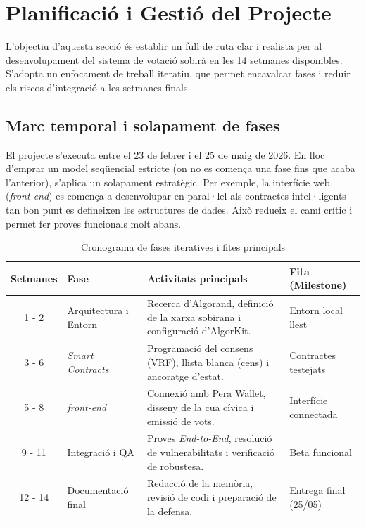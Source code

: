 \newpage
\section{Planificació i Gestió del Projecte}

L'objectiu d'aquesta secció és establir un full de ruta clar i realista per al desenvolupament del sistema de votació sobirà en les 14 setmanes disponibles. S'adopta un enfocament de treball iteratiu, que permet encavalcar fases i reduir els riscos d'integració a les setmanes finals.

\subsection{Marc temporal i solapament de fases}

El projecte s'executa entre el 23 de febrer i el 25 de maig de 2026. En lloc d'emprar un model seqüencial estricte (on no es comença una fase fins que acaba l'anterior), s'aplica un solapament estratègic. Per exemple, la interfície web (\textit{front-end}) es comença a desenvolupar en paral·lel als contractes intel·ligents tan bon punt es defineixen les estructures de dades. Això redueix el camí crític i permet fer proves funcionals molt abans.



\begin{table}[H]
\centering
\renewcommand{\arraystretch}{1.3}
\begin{tabularx}{\textwidth}{|c|l|X|l|}
\hline
\textbf{Setmanes} & \textbf{Fase} & \textbf{Activitats principals} & \textbf{Fita (Milestone)} \\ \hline
1 - 2 & Arquitectura i Entorn & Recerca d'Algorand, definició de la xarxa sobirana i configuració d'AlgorKit. & Entorn local llest \\ \hline
3 - 6 & \textit{Smart Contracts} & Programació del consens (VRF), llista blanca (cens) i ancoratge d'estat. & Contractes testejats \\ \hline
5 - 8 & \textit{front-end} & Connexió amb Pera Wallet, disseny de la cua cívica i emissió de vots. & Interfície connectada \\ \hline
9 - 11 & Integració i QA & Proves \textit{End-to-End}, resolució de vulnerabilitats i verificació de robustesa. & Beta funcional \\ \hline
12 - 14 & Documentació final & Redacció de la memòria, revisió de codi i preparació de la defensa. & Entrega final (25/05) \\ \hline
\end{tabularx}
\caption{Cronograma de fases iteratives i fites principals}
\end{table}

